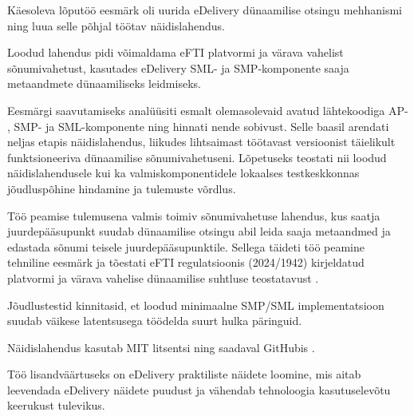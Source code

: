 Käesoleva lõputöö eesmärk oli uurida eDelivery dünaamilise otsingu mehhanismi 
ning luua selle põhjal töötav näidislahendus.

Loodud lahendus pidi võimaldama eFTI platvormi ja värava vahelist sõnumivahetust,
kasutades eDelivery SML- ja SMP-komponente saaja metaandmete dünaamiliseks leidmiseks.

Eesmärgi saavutamiseks analüüsiti esmalt olemasolevaid avatud lähtekoodiga 
AP- , SMP- ja SML-komponente ning hinnati nende sobivust.
Selle baasil arendati neljas etapis näidislahendus, liikudes lihtsaimast töötavast versioonist
täielikult funktsioneeriva dünaamilise sõnumivahetuseni.
Lõpetuseks teostati nii loodud näidislahendusele kui ka valmiskomponentidele lokaalses
testkeskkonnas jõudluspõhine hindamine ja tulemuste võrdlus.

Töö peamise tulemusena valmis toimiv sõnumivahetuse lahendus,
kus saatja juurdepääsupunkt suudab dünaamilise otsingu abil leida saaja metaandmed
ja edastada sõnumi teisele juurdepääsupunktile. Sellega täideti töö peamine tehniline eesmärk
ja tõestati eFTI regulatsioonis (2024/1942) kirjeldatud platvormi ja värava vahelise
dünaamilise suhtluse teostatavust \cite{eu_reg_2024_1942}.

Jõudlustestid kinnitasid, et loodud minimaalne SMP/SML implementatsioon suudab
väikese latentsusega töödelda suurt hulka päringuid. 

Näidislahendus kasutab MIT litsentsi ning saadaval GitHubis \cite{github_edelivery_smp_sml}.

Töö lisandväärtuseks on eDelivery praktiliste näidete loomine, mis aitab leevendada eDelivery
näidete puudust ja vähendab tehnoloogia kasutuselevõtu keerukust tulevikus.